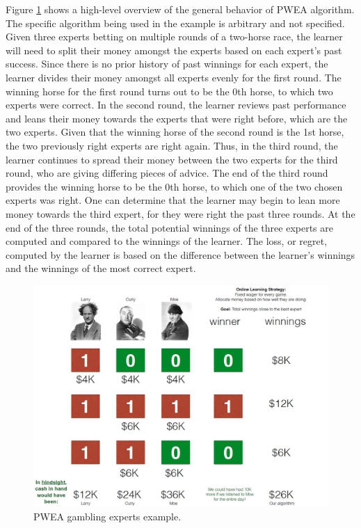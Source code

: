 \documentclass[11pt]{article}
\begin{document}
Figure \ref{img:pwea-example} shows a high-level overview of the general behavior of PWEA algorithm. The specific algorithm being used in the example is arbitrary and not specified. Given three experts betting on multiple rounds of a two-horse race, the learner will need to split their money amongst the experts based on each expert's past success. Since there is no prior history of past winnings for each expert, the learner divides their money amongst all experts evenly for the first round. The winning horse for the first round turns out to be the 0th horse, to which two experts were correct. In the second round, the learner reviews past performance and leans their money towards the experts that were right before, which are the two experts. Given that the winning horse of the second round is the 1st horse, the two previously right experts are right again. Thus, in the third round, the learner continues to spread their money between the two experts for the third round, who are giving differing pieces of advice. The end of the third round provides the winning horse to be the 0th horse, to which one of the two chosen experts was right. One can determine that the learner may begin to lean more money towards the third expert, for they were right the past three rounds. At the end of the three rounds, the total potential winnings of the three experts are computed and compared to the winnings of the learner. The loss, or regret, computed by the learner is based on the difference between the learner's winnings and the winnings of the most correct expert. 

\begin{figure}[H]
\centering
\includegraphics[width=4.5in]{pwea_gambling_example.JPG}
\caption{PWEA gambling experts example.}
\label{img:pwea-example}
\end{figure}
\end{document}
